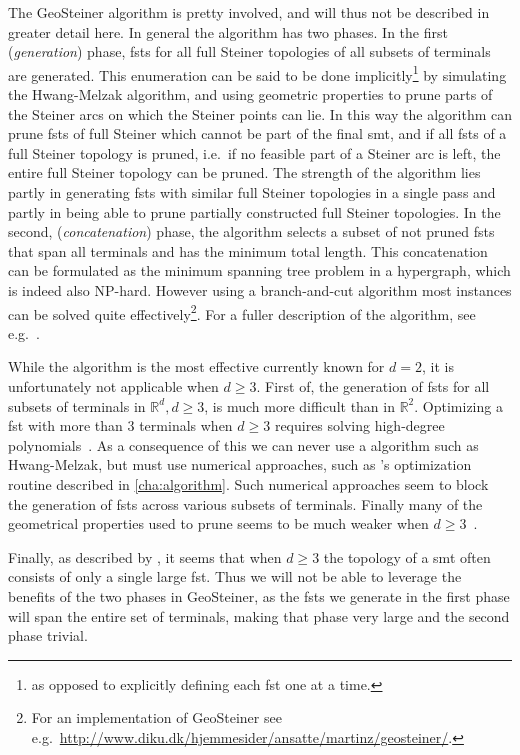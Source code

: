 The GeoSteiner algorithm is pretty involved, and will thus not be described in
greater detail here. In general the algorithm has two phases. In the first
(\textit{generation}) phase, \acp{fst} for all full Steiner topologies of all
subsets of terminals are generated. This enumeration can be said to be done
implicitly\footnote{as opposed to explicitly defining each \ac{fst} one at a
  time.} by simulating the Hwang-Melzak algorithm, and using geometric
properties to prune parts of the Steiner arcs on which the Steiner points can
lie. In this way the algorithm can prune \acp{fst} of full Steiner which cannot
be part of the final \ac{smt}, and if all \acp{fst} of a full Steiner topology
is pruned, i.e.\ if no feasible part of a Steiner arc is left, the entire full
Steiner topology can be pruned. The strength of the algorithm lies partly in
generating \acp{fst} with similar full Steiner topologies in a single pass and
partly in being able to prune partially constructed full Steiner topologies. In
the second, (\textit{concatenation}) phase, the algorithm selects a subset of
not pruned \acp{fst} that span all terminals and has the minimum total
length. This concatenation can be formulated as the minimum spanning tree
problem in a hypergraph, which is indeed also NP-hard. However using a
branch-and-cut algorithm most instances can be solved quite
effectively\footnote{For an implementation of GeoSteiner see e.g.\
  \url{http://www.diku.dk/hjemmesider/ansatte/martinz/geosteiner/}.}. For a
fuller description of the algorithm, see e.g.\ \textcite[sec.~1.4]{brazil2015}.

While the algorithm is the most effective currently known for $d = 2$, it is
unfortunately not applicable when $d \ge 3$. First of, the generation of
\acp{fst} for all subsets of terminals in $\mathbb{R}^d, d \ge 3$, is much more
difficult than in $\mathbb{R}^2$. Optimizing a \ac{fst} with more than $3$
terminals when $d \ge 3$ requires solving high-degree
polynomials~\cite{smith1992}. As a consequence of this we can never use a
algorithm such as Hwang-Melzak, but must use numerical approaches, such as
\citeauthor{smith1992}'s optimization routine described in
\cref{cha:algorithm}. Such numerical approaches seem to block the generation of
\acp{fst} across various subsets of terminals. Finally many of the geometrical
properties used to prune seems to be much weaker when
$d \ge 3$~\cite{fonseca2014}.

Finally, as described by \textcite{smith1992}, it seems that when $d \ge 3$ the
topology of a \ac{smt} often consists of only a single large \ac{fst}. Thus we
will not be able to leverage the benefits of the two phases in GeoSteiner, as
the \acp{fst} we generate in the first phase will span the entire set of
terminals, making that phase very large and the second phase trivial.

